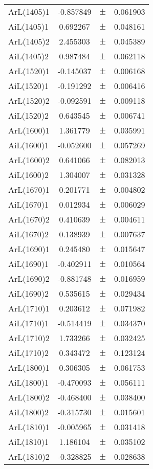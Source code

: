 \begin{table}
\begin{tiny}
\begin{tabular}{lccc}
ArL(1405)1 & -0.857849 & $\pm$ & 0.061903 \\
AiL(1405)1 & 0.692267 & $\pm$ & 0.048161 \\
ArL(1405)2 & 2.455303 & $\pm$ & 0.045389 \\
AiL(1405)2 & 0.987484 & $\pm$ & 0.062118 \\
ArL(1520)1 & -0.145037 & $\pm$ & 0.006168 \\
AiL(1520)1 & -0.191292 & $\pm$ & 0.006416 \\
ArL(1520)2 & -0.092591 & $\pm$ & 0.009118 \\
AiL(1520)2 & 0.643545 & $\pm$ & 0.006741 \\
ArL(1600)1 & 1.361779 & $\pm$ & 0.035991 \\
AiL(1600)1 & -0.052600 & $\pm$ & 0.057269 \\
ArL(1600)2 & 0.641066 & $\pm$ & 0.082013 \\
AiL(1600)2 & 1.304007 & $\pm$ & 0.031328 \\
ArL(1670)1 & 0.201771 & $\pm$ & 0.004802 \\
AiL(1670)1 & 0.012934 & $\pm$ & 0.006029 \\
ArL(1670)2 & 0.410639 & $\pm$ & 0.004611 \\
AiL(1670)2 & 0.138939 & $\pm$ & 0.007637 \\
ArL(1690)1 & 0.245480 & $\pm$ & 0.015647 \\
AiL(1690)1 & -0.402911 & $\pm$ & 0.010564 \\
ArL(1690)2 & -0.881748 & $\pm$ & 0.016959 \\
AiL(1690)2 & 0.535615 & $\pm$ & 0.029434 \\
ArL(1710)1 & 0.203612 & $\pm$ & 0.071982 \\
AiL(1710)1 & -0.514419 & $\pm$ & 0.034370 \\
ArL(1710)2 & 1.733266 & $\pm$ & 0.032425 \\
AiL(1710)2 & 0.343472 & $\pm$ & 0.123124 \\
ArL(1800)1 & 0.306305 & $\pm$ & 0.061753 \\
AiL(1800)1 & -0.470093 & $\pm$ & 0.056111 \\
ArL(1800)2 & -0.468400 & $\pm$ & 0.038400 \\
AiL(1800)2 & -0.315730 & $\pm$ & 0.015601 \\
ArL(1810)1 & -0.005965 & $\pm$ & 0.031418 \\
AiL(1810)1 & 1.186104 & $\pm$ & 0.035102 \\
ArL(1810)2 & -0.328825 & $\pm$ & 0.028638 \\

\end{tabular}
\end{tiny}
\end{table}
